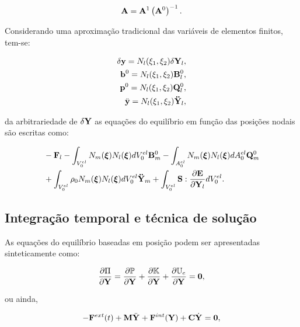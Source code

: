 \documentclass[tese_patricia]{subfiles}
\begin{document}
\begin{align}
\mathbf{A} = \mathbf{A}^{1}\left(\mathbf{A}^{0}\right)^{-1} \label{eq:gradDeformation}.
\end{align}

Considerando uma aproximação tradicional das variáveis de elementos finitos, tem-se:

\begin{align}
\delta\mathbf{y} = N_{l} (\xi_{1},\xi_{2})\delta\mathbf{Y}_{l},\\
\mathbf{b}^0 = N_{l} (\xi_{1},\xi_{2}) \mathbf{B}_{l}^{0},\\
\mathbf{p}^{0} = N_{l} (\xi_{1},\xi_{2}) \mathbf{Q}_{l}^{0},\\
\ddot{\mathbf{y}} = N_{l} (\xi_{1},\xi_{2}) \mathbf{\ddot{Y}}_{l},
\end{align}

\noindent da arbitrariedade de $\delta\mathbf{Y}$ as equações do equilíbrio em função das posições nodais são escritas como:

\begin{align}
\begin{split}
&-\mathbf{F}_{l} - \int_{V_{0}^{el}}N_{m} (\bm{\xi})N_{l} (\bm{\xi})dV_{0}^{el} \mathbf{B}_{m}^{0} -\int_{A_{0}^{el}}N_{m} (\bm{\xi})N_{l} (\bm{\xi})dA_{0}^{el} \mathbf{Q}_{m}^{0}  \\& + \int_{V_{0}^{el}}\rho_{0} N_{m} (\bm{\xi})N_{l} (\bm{\xi})dV_{0}^{el} \mathbf{\ddot{Y}}_{m} + \int_{V_{0}^{el}} \mathbf{S} : \frac{\partial\mathbf{E}}{\partial\mathbf{Y}_{l}}dV_{0}^{el}.
\end{split}
\end{align}

\subsection{Integração temporal e técnica de solução}

As equações do equilíbrio baseadas em posição podem ser apresentadas sinteticamente como:

\begin{align}
\frac{\partial\Pi}{\partial\mathbf{Y}} = \frac{\partial\mathbb{P}}{\partial \mathbf{Y}} + \frac{\partial\mathbb{K}}{\partial \mathbf{Y}} + \frac{\partial\mathbb{U}_e}{\partial \mathbf{Y}} = \mathbf{0},
\end{align}
  
\noindent ou ainda,

\begin{align}
 - \mathbf{F}^{ext}(t) + \mathbf{M}\ddot{\mathbf{Y}}_{}+ \mathbf{F}^{int}(\mathbf{Y}) + \mathbf{C}\dot{\mathbf{Y}}_{} = \mathbf{0}, \label{eq:Equilibrio}
\end{align}
\end{document}
